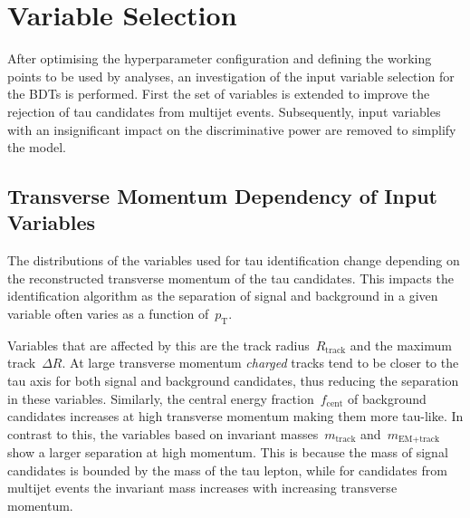 \section{Variable Selection}
\label{sec:bdt_variable_selection}

After optimising the hyperparameter configuration and defining the working
points to be used by analyses, an investigation of the input variable selection
for the BDTs is performed. First the set of variables is extended to improve the
rejection of tau candidates from multijet events. Subsequently, input variables
with an insignificant impact on the discriminative power are removed to simplify
the model.

\subsection{Transverse Momentum Dependency of Input Variables}
\label{sec:bdt_incl_pt}


The distributions of the variables used for tau identification change depending
on the reconstructed transverse momentum of the tau candidates. This impacts the
identification algorithm as the separation of signal and background in a given
variable often varies as a function of~$p_\text{T}$.

Variables that are affected by this are the track radius~$R_\text{track}$ and
the maximum track~$\Delta R$. At large transverse momentum \emph{charged} tracks
tend to be closer to the tau axis for both signal and background candidates,
thus reducing the separation in these variables. Similarly, the central energy
fraction~$f_\text{cent}$ of background candidates increases at high transverse
momentum making them more tau-like. In contrast to this, the variables based on
invariant masses~$m_\text{track}$ and~$m_\text{EM+track}$ show a larger
separation at high momentum. This is because the mass of signal candidates is
bounded by the mass of the tau lepton, while for candidates from multijet events
the invariant mass increases with increasing transverse momentum. 

